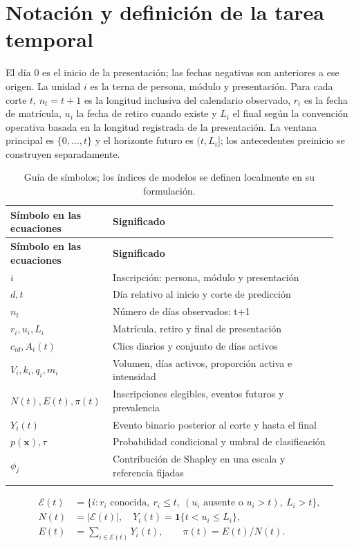 \section{Notación y definición de la tarea temporal}
El día 0 es el inicio de la presentación; las fechas negativas son anteriores a ese origen. La unidad $i$ es la terna de persona, módulo y presentación. Para cada corte $t$, $n_t=t+1$ es la longitud inclusiva del calendario observado, $r_i$ es la fecha de matrícula, $u_i$ la fecha de retiro cuando existe y $L_i$ el final según la convención operativa basada en la longitud registrada de la presentación. La ventana principal es $\{0,\ldots,t\}$ y el horizonte futuro es $(t,L_i]$; los antecedentes preinicio se construyen separadamente.
\Needspace{0.42\textheight}
\begingroup\small\setlength{\tabcolsep}{3pt}\renewcommand{\arraystretch}{1.16}
\begin{longtable}{>{\raggedright\arraybackslash}p{0.27\linewidth}>{\raggedright\arraybackslash}p{0.67\linewidth}}
\caption{Guía de símbolos; los índices de modelos se definen localmente en su formulación.}\label{corr:simbolos}\\
\toprule
\textbf{Símbolo en las ecuaciones} & \textbf{Significado} \\
\midrule\endfirsthead
\toprule
\textbf{Símbolo en las ecuaciones} & \textbf{Significado} \\
\midrule\endhead
\bottomrule\endfoot
$i$ & Inscripción: persona, módulo y presentación \\*
$d,t$ & Día relativo al inicio y corte de predicción \\*
$n_t$ & Número de días observados: t+1 \\*
$r_i,u_i,L_i$ & Matrícula, retiro y final de presentación \\*
$c_{id},A_i(t)$ & Clics diarios y conjunto de días activos \\*
$V_i,k_i,q_i,m_i$ & Volumen, días activos, proporción activa e intensidad \\*
$N(t),E(t),\pi(t)$ & Inscripciones elegibles, eventos futuros y prevalencia \\*
$Y_i(t)$ & Evento binario posterior al corte y hasta el final \\*
$p(\mathbf{x}),\tau$ & Probabilidad condicional y umbral de clasificación \\*
$\phi_j$ & Contribución de Shapley en una escala y referencia fijadas \\*
\end{longtable}\endgroup
\begin{align}
\mathcal E(t)&=\{i:r_i\text{ conocida},\ r_i\le t,\ (u_i\text{ ausente o }u_i>t),\ L_i>t\},\label{corr:elegibilidad}\\
N(t)&=|\mathcal E(t)|,\quad Y_i(t)=\mathbf 1\{t<u_i\le L_i\},\label{corr:evento}\\
E(t)&=\sum_{i\in\mathcal E(t)}Y_i(t),\qquad \pi(t)=E(t)/N(t).\label{corr:prevalencia}
\end{align}
